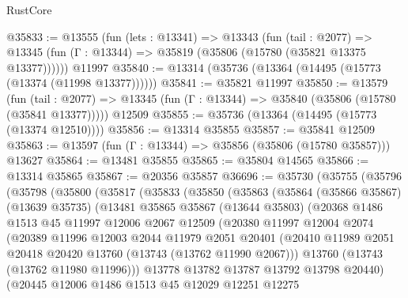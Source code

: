 \begin{lexlean}{RustCore}
\begin{coremodule}
@35833 := @13555
    (fun (lets : @13341) =>
    @13343
      (fun (tail : @2077) =>
      @13345 (fun (Γ : @13344) => @35819 (@35806 (@15780 (@35821 @13375 @13377))))))
    @11997
@35840 := @13314 (@35736 (@13364 (@14495 (@15773 (@13374 (@11998 @13377))))))
@35841 := @35821 @11997
@35850 := @13579
    (fun (tail : @2077) => @13345 (fun (Γ : @13344) => @35840 (@35806 (@15780 (@35841 @13377)))))
    @12509
@35855 := @35736 (@13364 (@14495 (@15773 (@13374 @12510))))
@35856 := @13314 @35855
@35857 := @35841 @12509
@35863 := @13597 (fun (Γ : @13344) => @35856 (@35806 (@15780 @35857))) @13627
@35864 := @13481 @35855
@35865 := @35804 @14565
@35866 := @13314 @35865
@35867 := @20356 @35857
@36696 := @35730
    (@35755
      (@35796
        (@35798
          (@35800
            (@35817
              (@35833
                (@35850
                  (@35863
                    (@35864
                      (@35866 @35867)
                      (@13639 @35735)
                      (@13481
                        @35865
                        @35867
                        (@13644 @35803)
                        (@20368
                          @1486
                          @1513
                          @45
                          @11997
                          @12006
                          @2067
                          @12509
                          (@20380
                            @11997
                            @12004
                            @2074
                            (@20389
                              @11996
                              @12003
                              @2044
                              @11979
                              @2051
                              @20401
                              (@20410
                                @11989
                                @2051
                                @20418
                                @20420
                                @13760
                                (@13743 (@13762 @11990 @2067)))
                              @13760
                              (@13743 (@13762 @11980 @11996)))
                            @13778
                            @13782
                            @13787
                            @13792
                            @13798
                            @20440)
                          (@20445
                            @12006
                            @1486
                            @1513
                            @45
                            @12029
                            @12251
                            @12275

\end{coremodule}
\end{lexlean}
